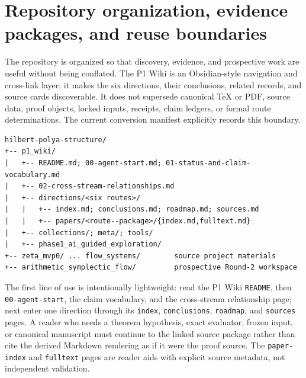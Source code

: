 \section{Repository organization, evidence packages, and reuse boundaries}
\label{app:architecture}

The repository is organized so that discovery, evidence, and prospective work
are useful without being conflated. The P1 Wiki is an Obsidian-style navigation
and cross-link layer; it makes the six directions, their conclusions, related
records, and source cards discoverable. It does not supersede canonical TeX or
PDF, source data, proof objects, locked inputs, receipts, claim ledgers, or
formal route determinations. The current conversion manifest explicitly
records this boundary.

\begin{center}
\small
\begin{verbatim}
hilbert-polya-structure/
+-- p1_wiki/
|   +-- README.md; 00-agent-start.md; 01-status-and-claim-vocabulary.md
|   +-- 02-cross-stream-relationships.md
|   +-- directions/<six routes>/
|   |   +-- index.md; conclusions.md; roadmap.md; sources.md
|   |   +-- papers/<route--package>/{index.md,fulltext.md}
|   +-- collections/; meta/; tools/
|   +-- phase1_ai_guided_exploration/
+-- zeta_mvp0/ ... flow_systems/        source project materials
+-- arithmetic_symplectic_flow/         prospective Round-2 workspace
\end{verbatim}
\end{center}

The first line of use is intentionally lightweight: read the P1 Wiki
\texttt{README}, then \texttt{00-agent-start}, the claim vocabulary, and the
cross-stream relationship page; next enter one direction through its
\texttt{index}, \texttt{conclusions}, \texttt{roadmap}, and \texttt{sources}
pages. A reader who needs a theorem hypothesis, exact evaluator, frozen input,
or canonical manuscript must continue to the linked source package rather than
cite the derived Markdown rendering as if it were the proof source. The
\texttt{paper-index} and \texttt{fulltext} pages are reader aids with explicit
source metadata, not independent validation.

